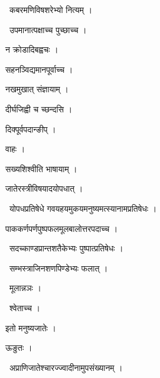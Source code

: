\documentclass[10pt, openany, oneside]{book}
\begin{document}
\par\noindent\hspace{1.5em}{\vps वा॰}~{\qt कबरमणिविषशरेभ्यो नित्यम् ।}

\par\noindent\hspace{1.5em}{\vps वा॰}~{\qt उपमानात्पक्षाच्च पुच्छाच्च ।}

\noindent न क्रोडादिबह्वचः ।

\noindent सहनञ्विद्यमानपूर्वाच्च ।

\noindent नखमुखात् संज्ञायाम् ।

\noindent दीर्घजिह्वी च च्छन्दसि ।

\noindent दिक्पूर्वपदान्ङीप् ।

\noindent वाहः ।

\noindent सख्यशिश्वीति भाषायाम् ।

\noindent जातेरस्त्रीविषयादयोपधात् ।

\par\noindent\hspace{1.5em}{\vps वा॰}~{\qt योपधप्रतिषेधे गवयहयमुकयमनुष्यमत्स्यानामप्रतिषेधः ।}

\noindent पाककर्णपर्णपुष्पफलमूलबालोत्तरपदाच्च ।

\par\noindent\hspace{1.5em}{\vps वा॰}~{\qt सदच्काण्डप्रान्तशतैकेभ्यः पुष्पात्प्रतिषेधः ।}

\par\noindent\hspace{1.5em}{\vps वा॰}~{\qt सम्भस्त्राजिनशणपिण्डेभ्यः फलात् ।}

\par\noindent\hspace{1.5em}{\vps वा॰}~{\qt मूलान्नञः ।}

\par\noindent\hspace{1.5em}{\vps वा॰}~{\qt श्वेताच्च ।}

\noindent इतो मनुष्यजातेः ।

\noindent ऊङुतः ।

\par\noindent\hspace{1.5em}{\vps वा॰}~{\qt अप्राणिजातेश्चारज्ज्वादीनामुपसंख्यानम् ।}
\end{document}

